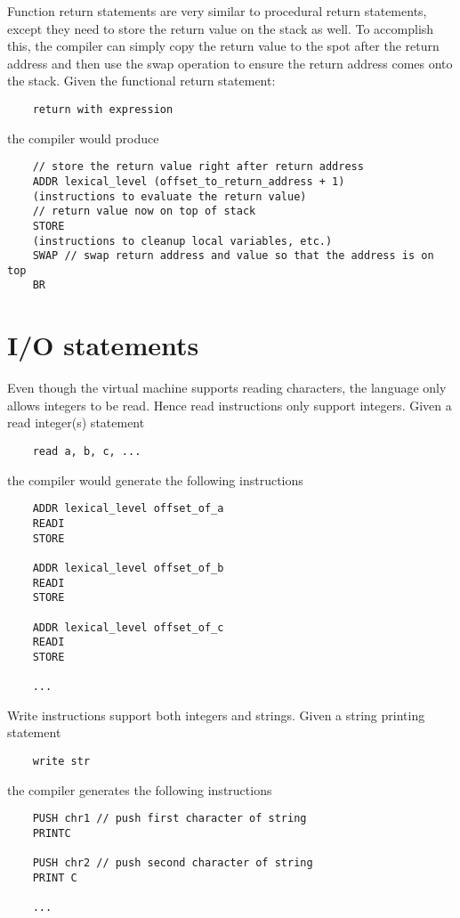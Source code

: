 \documentclass{article}
\begin{document}
\noindent
Function return statements are very similar to procedural return statements, except they need to store the return value on the stack as well. To accomplish this, the compiler can simply copy the return value to the spot after the return address and then use the swap operation to ensure the return address comes onto the stack.
\newline
\newline
Given the functional return statement:
\begin{lstlisting}
    return with expression
\end{lstlisting}
the compiler would produce
\begin{lstlisting}
    // store the return value right after return address
    ADDR lexical_level (offset_to_return_address + 1)
    (instructions to evaluate the return value)
    // return value now on top of stack
    STORE
    (instructions to cleanup local variables, etc.)
    SWAP // swap return address and value so that the address is on top
    BR
\end{lstlisting}

\newpage
\section{I/O statements}

Even though the virtual machine supports reading characters, the language only allows integers to be read. Hence read instructions only support integers.
\newline
\newline
Given a read integer(s) statement
\begin{lstlisting}
    read a, b, c, ...
\end{lstlisting}
the compiler would generate the following instructions
\begin{lstlisting}
    ADDR lexical_level offset_of_a
    READI
    STORE
    
    ADDR lexical_level offset_of_b
    READI
    STORE
    
    ADDR lexical_level offset_of_c
    READI
    STORE
    
    ...
\end{lstlisting}

\noindent
Write instructions support both integers and strings.
\newline
\newline
Given a string printing statement
\begin{lstlisting}
    write str
\end{lstlisting}
the compiler generates the following instructions
\begin{lstlisting}
    PUSH chr1 // push first character of string
    PRINTC
    
    PUSH chr2 // push second character of string
    PRINT C
    
    ...
\end{lstlisting}
\end{document}
